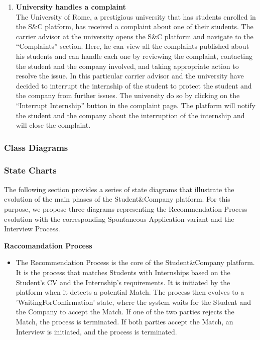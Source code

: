 \begin{enumerate}
    \item \textbf{\textcolor{titleColor}{University handles a complaint}}\\
        The University of Rome, a prestigious university that has students enrolled in the S\&C platform, has received a complaint about one of their students. The carrier advisor at the university opens the S\&C platform and navigate to the “Complaints” section. Here, he can view all the complaints published about his students and can handle each one by reviewing the complaint, contacting the student and the company involved, and taking appropriate action to resolve the issue.
        In this particular carrier advisor and the university have decided to interrupt the internship of the student to protect the student and the company from further issues. The university do so by clicking on the “Interrupt Internship” button in the complaint page. The platform will notify the student and the company about the interruption of the internship and will close the complaint.
\end{enumerate}


\subsubsection{Class Diagrams}

\subsubsection{State Charts}
The following section provides a series of state diagrams that illustrate the evolution of the main phases of the Student\&Company platform. For this purpose, we propose three diagrams representing the Recommendation Process evolution with the corresponding Spontaneous Application variant and the Interview Process.

\textbf{Raccomandation Process}\\
\begin{itemize}
    \item The Recommendation Process is the core of the Student\&Company platform. It is the process that matches Students with Internships based on the Student's CV and the Internship's requirements. It is initiated by the platform when it detects a potential Match. The process then evolves to a 'WaitingForConfirmation' state, where the system waits for the Student and the Company to accept the Match. If one of the two parties rejects the Match, the process is terminated. If both parties accept the Match, an Interview is initiated, and the process is terminated.
\end{itemize}

